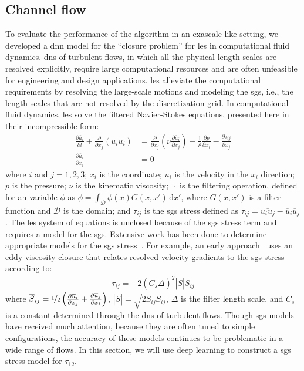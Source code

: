 \documentclass[review]{elsarticle}
\newcommand{\ud}{\,\mathrm{d}}
\newcommand{\pfrac}[2]{\frac{\partial#1}{\partial#2}}
\newcommand{\ol}[1]{\overline{#1}}
\begin{document}
\subsection{Channel flow}\label{sec:channel}

To evaluate the performance of the algorithm in an exascale-like setting, we
developed a \gls{dnn} model for the ``closure problem'' for
\gls{les} in computational fluid dynamics. \Gls{dns} of turbulent
flows, in which all the physical length scales are resolved
explicitly, require large computational resources and are often
unfeasible for engineering and design applications. \Gls{les}
alleviate the computational requirements by resolving the large-scale
motions and modeling the \gls{sgs}, i.e., the length scales that
are not resolved by the discretization grid. In computational fluid
dynamics, \gls{les} solve the filtered Navier-Stokes equations,
presented here in their incompressible form:
\begin{align}
  \label{eq:fns}
  \pfrac{\ol{u}_i}{t} + \pfrac{}{x_j} \left( \ol{u}_i \ol{u}_i \right) &= \pfrac{}{x_j} \left( \nu \pfrac{\ol{u}_i}{x_j} \right) - \frac{1}{\rho} \pfrac{\ol{p}}{x_i} - \pfrac{\tau_{ij}}{x_j}\\
  \pfrac{\ol{u}_i}{x_i} &= 0
\end{align}
where $i$ and $j = 1,2,3$; $x_i$ is the coordinate; $u_i$ is the
velocity in the $x_i$ direction; $p$ is the pressure; $\nu$ is the
kinematic viscosity; $\ol{\cdot}$ is the filtering operation, defined
for an variable $\phi$ as
$\ol{\phi} = \int_{\mathcal{D}} \phi(x) G(x,x') \ud{} x'$, where
$G(x,x')$ is a filter function and $\mathcal{D}$ is the domain; and
$\tau_{ij}$ is the \gls{sgs} stress defined as
$\tau_{ij} = \ol{u_i u_j} - \ol{u}_i\ol{u}_j$. The \gls{les} system of
equations is unclosed because of the \gls{sgs} stress term and
requires a model for the \gls{sgs}. Extensive work has been done to
determine appropriate models for the \gls{sgs}
stress~\cite{Rogallo1984,Lesieur1996,Piomelli1999,Meneveau2000}. For
example, an early approach~\cite{Smagorinsky1963} uses an eddy
viscosity closure that relates resolved velocity gradients to the
\gls{sgs} stress according to:
\begin{align}
  \label{eq:smag}
  \tau_{ij} = -2 (C_s \ol{\Delta})^2 |\ol{S}| \ol{S}_{ij}
\end{align}
where
$\ol{S}_{ij} = \nicefrac{1}{2} \left( \pfrac{\ol{u}_i}{x_j} +
  \pfrac{\ol{u}_j}{x_i} \right)$,
$|\ol{S}| = \sqrt{2 \ol{S}_{ij} \ol{S}_{ij}}$, $\ol{\Delta}$ is the
filter length scale, and $C_s$ is a constant determined through the
\gls{dns} of turbulent flows. Though \gls{sgs} models have received
much attention, because they are often tuned to simple configurations,
the accuracy of these models continues to be problematic in a wide
range of flows. In this section, we will use deep learning to
construct a \gls{sgs} stress model for $\tau_{12}$.
\end{document}
